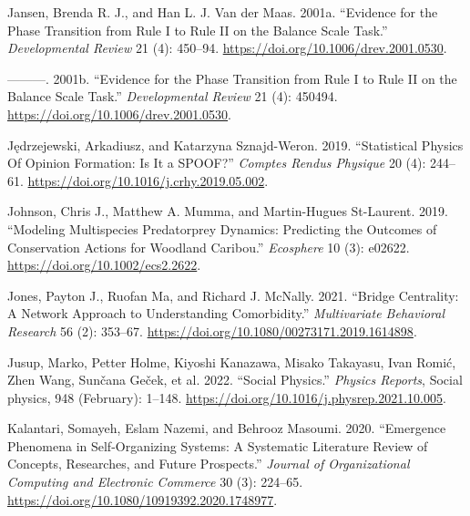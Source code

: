 \documentclass[
  a4paper,
  DIV=11,
  numbers=noendperiod]{scrreprt}
\newlength{\cslhangindent}
\newlength{\cslentryspacingunit} %
\newenvironment{CSLReferences}[2] %
 {%
  \setlength{\parindent}{0pt}
  \ifodd #1
  \let\oldpar\par
  \def\par{\hangindent=\cslhangindent\oldpar}
  \fi
  \setlength{\parskip}{#2\cslentryspacingunit}
 }%
 {}
\begin{document}
\begin{CSLReferences}{1}{0}
\leavevmode{}%
Jansen, Brenda R. J., and Han L. J. Van der Maas. 2001a. {``Evidence for
the {Phase Transition} from {Rule I} to {Rule II} on the {Balance Scale
Task}.''} \emph{Developmental Review} 21 (4): 450--94.
\url{https://doi.org/10.1006/drev.2001.0530}.

\leavevmode{}%
---------. 2001b. {``Evidence for the Phase Transition from Rule I to
Rule II on the Balance Scale Task.''} \emph{Developmental Review} 21
(4): 450494. \url{https://doi.org/10.1006/drev.2001.0530}.

\leavevmode{}%
Jędrzejewski, Arkadiusz, and Katarzyna Sznajd-Weron. 2019.
{``Statistical {Physics Of Opinion Formation}: {Is} It a {SPOOF}?''}
\emph{Comptes Rendus Physique} 20 (4): 244--61.
\url{https://doi.org/10.1016/j.crhy.2019.05.002}.

\leavevmode{}%
Johnson, Chris J., Matthew A. Mumma, and Martin-Hugues St-Laurent. 2019.
{``Modeling Multispecies Predator\textendash prey Dynamics: Predicting
the Outcomes of Conservation Actions for Woodland Caribou.''}
\emph{Ecosphere} 10 (3): e02622.
\url{https://doi.org/10.1002/ecs2.2622}.

\leavevmode{}%
Jones, Payton J., Ruofan Ma, and Richard J. McNally. 2021. {``Bridge
{Centrality}: {A Network Approach} to {Understanding Comorbidity}.''}
\emph{Multivariate Behavioral Research} 56 (2): 353--67.
\url{https://doi.org/10.1080/00273171.2019.1614898}.

\leavevmode{}%
Jusup, Marko, Petter Holme, Kiyoshi Kanazawa, Misako Takayasu, Ivan
Romić, Zhen Wang, Sunčana Geček, et al. 2022. {``Social Physics.''}
\emph{Physics Reports}, Social physics, 948 (February): 1--148.
\url{https://doi.org/10.1016/j.physrep.2021.10.005}.

\leavevmode{}%
Kalantari, Somayeh, Eslam Nazemi, and Behrooz Masoumi. 2020.
{``Emergence Phenomena in Self-Organizing Systems: A Systematic
Literature Review of Concepts, Researches, and Future Prospects.''}
\emph{Journal of Organizational Computing and Electronic Commerce} 30
(3): 224--65. \url{https://doi.org/10.1080/10919392.2020.1748977}.


\end{CSLReferences}
\end{document}
